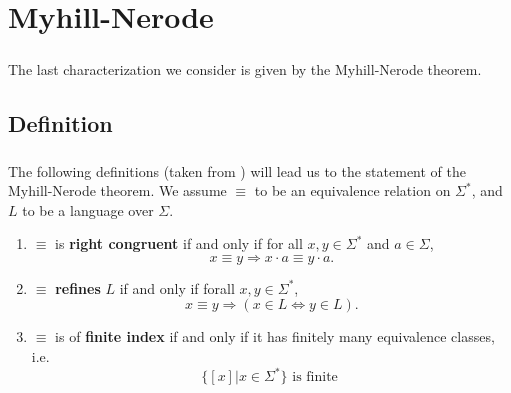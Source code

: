 
\chapter{Myhill-Nerode}

\paragraph{}

The last characterization we consider is given by the Myhill-Nerode theorem.

\section{Definition}

\paragraph{}

The following definitions (taken from \cite{DBLP:books/daglib/0088160}) will lead us to the statement of the Myhill-Nerode theorem.
We assume $\equiv$ to be an equivalence relation on $\Sigma^*$, and $L$ to be a language over $\Sigma$.

\begin{enumerate}[label=(\roman*)]

    \item\label{rightcongruent}
        $\equiv$ is \textbf{right congruent} if and only if for all $x, y \in \Sigma^*$ and $a \in \Sigma$,
        \[
            x \equiv y \Rightarrow
            x \cdot a \equiv y \cdot a.
            \]


        \item\label{refinement}
            $\equiv$ \textbf{refines} $L$ if and only if forall $x,y \in \Sigma^*$,
            \[
                x \equiv y \Rightarrow
                (x \in L \Leftrightarrow y \in L).
                \]

            \item\label{finiteindex}
                $\equiv$ is of \textbf{finite index} if and only if it has finitely many equivalence classes, i.e.
                \[
                    \{[x] | x \in \Sigma^*\} \mbox{ is finite }
                    \]

            \end{enumerate}

